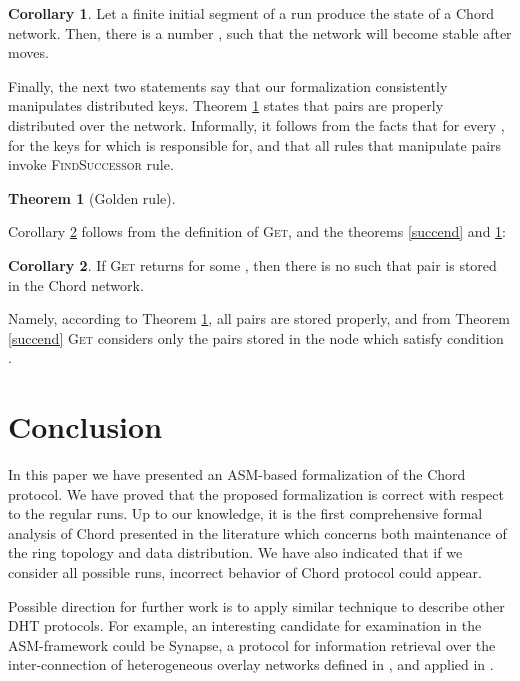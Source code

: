 \documentclass{amsart}
\theoremstyle{definition}
\newtheorem{theorem}{Theorem}[section]
\newtheorem{corollary}{Corollary}[section]
\begin{document}
\begin{corollary} \label{cor4}
Let a finite initial segment of a run produce the state  of a
Chord network. Then, there is a number , such that
the network will become stable after  moves.
\end{corollary}




Finally, the next two statements say that our formalization
consistently manipulates distributed keys. Theorem
\ref{golden_rule} states that  pairs are properly
distributed over the network. Informally, it follows from the
facts that for every ,  for
the keys for which  is responsible for, and that all rules that
manipulate  pairs invoke \textsc{FindSuccessor}
rule.

\begin{theorem}[Golden rule]\label{golden_rule}


\end{theorem}

Corollary \ref{corol1} follows from the definition of
\textsc{Get}, and the theorems \ref{succend} and
\ref{golden_rule}:

\begin{corollary} \label{corol1}
If \textsc{Get} returns  for some , then there is no  such that  pair is
stored in the Chord network.
\end{corollary}
Namely, according to Theorem \ref{golden_rule}, all 
pairs are stored properly, and from Theorem \ref{succend}
\textsc{Get} considers only the  pairs stored in the node  which
satisfy condition  .





\section{Conclusion}

\label{conclusion}

In this paper we have presented an ASM-based formalization of the Chord protocol. We have proved that the proposed formalization is
correct with respect to the regular runs. Up to our knowledge, it is the first comprehensive formal analysis of Chord presented in the
literature which concerns both maintenance of the ring topology and data distribution. We have also indicated that if we consider all
possible runs, incorrect behavior of Chord protocol could appear.

Possible direction for further work is to apply similar technique to describe other DHT protocols. For example, an interesting
candidate for examination in the ASM-framework could be Synapse, a protocol for information retrieval over the inter-connection of
heterogeneous overlay networks defined in \cite{LTVBCM10}, and applied in \cite{ohrid}.
\end{document}
